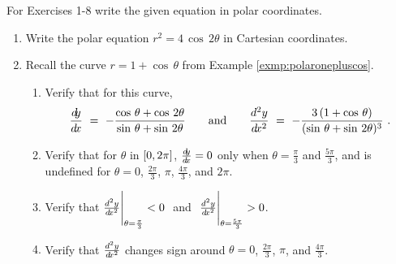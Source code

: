 \vspace{2mm}
\startexercises\label{sec7dot7}
{\small
{}
\par\noindent For Exercises 1-8 write the given equation in polar coordinates.
\begin{enumerate}[\bfseries 1.]
 \item Write the polar equation $r^2 = 4\,\cos\,2\theta$ in Cartesian
  coordinates.
 \item Recall the curve $r = 1 + \cos\,\theta$ from Example
  \ref{exmp:polaronepluscos}.
\begin{enumerate}[\bfseries (a)]
 \item Verify that for this curve,
\[
\frac{d\negmedspace y}{d\!x} ~=~ -\frac{\cos\,\theta + \cos\,2\theta}{\sin\,\theta + \sin\,2\theta}
\qquad\text{and}\qquad
\frac{d^2y}{d\!x^2} ~=~
-\frac{3\,(1 + \cos\,\theta)}{(\sin\,\theta + \sin\,2\theta)^3} ~.
\]
 \item Verify that for $\theta$ in $\lbrack 0,2\pi \rbrack$, $\frac{d\negmedspace y}{d\!x} = 0$ only when
  $\theta = \frac{\pi}{3}$ and $\frac{5\pi}{3}$, and is undefined for
  $\theta=0$, $\frac{2\pi}{3}$, $\pi$, $\frac{4\pi}{3}$, and $2\pi$.
 \item Verify that $\frac{d^2y}{d\!x^2} \Biggr|_{\theta=\frac{\pi}{3}} < 0~$ and
  $~\frac{d^2y}{d\!x^2} \Biggr|_{\theta=\frac{5\pi}{3}} > 0$.
 \item Verify that $\frac{d^2y}{d\!x^2}$ changes sign around $\theta=0$,
  $\frac{2\pi}{3}$, $\pi$, and $\frac{4\pi}{3}$.
\end{enumerate}

\end{enumerate}}
